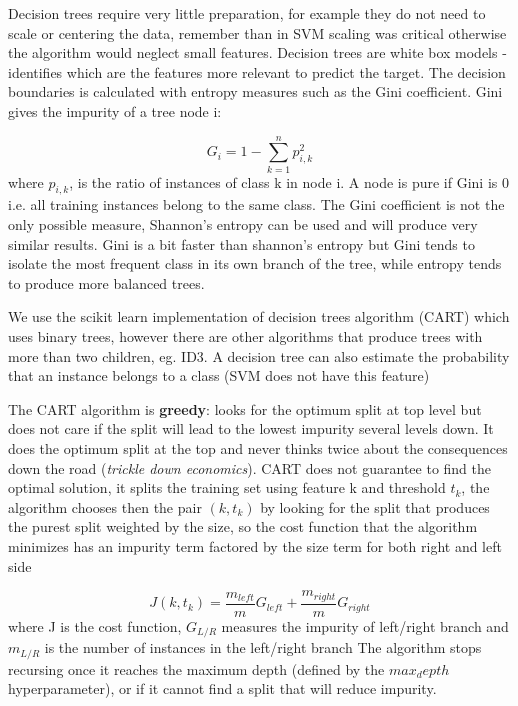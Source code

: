 \documentclass[11pt]{article}
\begin{document}
Decision trees require very little preparation, for example they do not need to scale or centering the data, remember than in SVM scaling was critical otherwise the algorithm would neglect small features.
Decision trees are white box models -identifies which are the features more relevant to predict the target.
The decision boundaries is calculated with entropy measures such as the Gini coefficient. Gini gives the impurity of a tree node i:

\begin{equation} \label{eq:gini}
G_i = 1- \sum_{k=1}^{n} p_{i,k}^2
\end{equation}
where $p_{i,k}$, is the ratio of instances of class k in node i. A node is pure if Gini is 0 i.e. all training instances belong to the same class. The Gini coefficient is not the only possible measure, Shannon's entropy can be used and will produce very similar results. Gini is a bit faster than shannon's entropy but Gini tends to isolate the most frequent class in its own branch of the tree, while entropy tends to produce more balanced trees. %

We use the scikit learn implementation of decision trees algorithm (CART) which uses binary trees, however there are other algorithms that produce trees with more than two children, eg. ID3.
A decision tree can also estimate the probability that an instance belongs to a class (SVM does not have this feature)

The CART algorithm is \textbf{greedy}: looks for the optimum split at top level but does not care if the split will lead to the lowest impurity several levels down. It does the optimum split at the top and never thinks twice about the consequences down the road (\emph{trickle down economics}). CART does not guarantee to find the optimal solution, it splits the training set using feature k and threshold $t_k$, the algorithm chooses then the pair $(k,t_k)$ by looking for the split that produces the purest split weighted by the size, so the cost function that the algorithm minimizes has an impurity term factored by the size term for both right and left side 

\begin{equation}\label{eq:cart}
J(k,t_k) = \frac{m_{left}}{m}G_{left} + \frac{m_{right}}{m}G_{right}
\end{equation}
where J is the cost function, $G_{L/R}$ measures the impurity of left/right branch and $m_{L/R}$ is the number of instances in the left/right branch 
The algorithm stops recursing once it reaches the maximum depth (defined by the $max_depth$ hyperparameter), or if it cannot find a split that will reduce impurity. 
\end{document}
